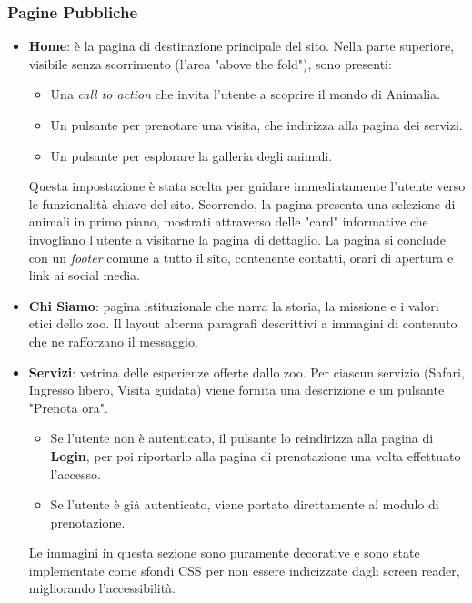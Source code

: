 \subsubsection{Pagine Pubbliche}
\begin{itemize}
    \item \textbf{Home}: è la pagina di destinazione principale del sito. Nella parte superiore, visibile senza scorrimento (l'area "above the fold"), sono presenti:
    \begin{itemize}
        \item Una \textit{call to action} che invita l'utente a scoprire il mondo di Animalia.
        \item Un pulsante per prenotare una visita, che indirizza alla pagina dei servizi.
        \item Un pulsante per esplorare la galleria degli animali.
    \end{itemize}
    Questa impostazione è stata scelta per guidare immediatamente l'utente verso le funzionalità chiave del sito.
    Scorrendo, la pagina presenta una selezione di animali in primo piano, mostrati attraverso delle "card" informative che invogliano l'utente a visitarne la pagina di dettaglio. La pagina si conclude con un \textit{footer} comune a tutto il sito, contenente contatti, orari di apertura e link ai social media.

    \item \textbf{Chi Siamo}: pagina istituzionale che narra la storia, la missione e i valori etici dello zoo. Il layout alterna paragrafi descrittivi a immagini di contenuto che ne rafforzano il messaggio.

    \item \textbf{Servizi}: vetrina delle esperienze offerte dallo zoo. Per ciascun servizio (Safari, Ingresso libero, Visita guidata) viene fornita una descrizione e un pulsante "Prenota ora".
    \begin{itemize}
        \item Se l'utente non è autenticato, il pulsante lo reindirizza alla pagina di \textbf{Login}, per poi riportarlo alla pagina di prenotazione una volta effettuato l'accesso.
        \item Se l'utente è già autenticato, viene portato direttamente al modulo di prenotazione.
    \end{itemize}
    Le immagini in questa sezione sono puramente decorative e sono state implementate come sfondi CSS per non essere indicizzate dagli screen reader, migliorando l'accessibilità.
    

\end{itemize}
